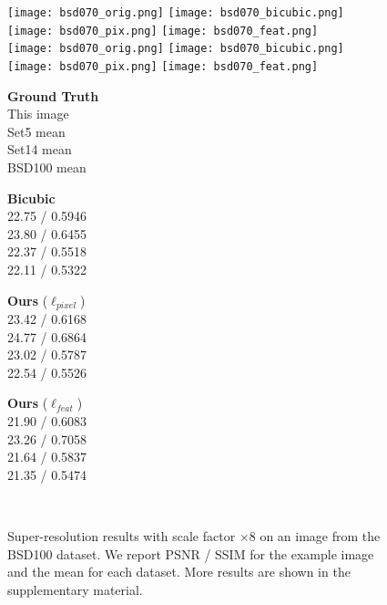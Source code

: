 \documentclass[runningheads]{llncs}
\begin{document}
\begin{figure}[t]
   \centering
\texttt{[image: bsd070\_orig.png]}
  \texttt{[image: bsd070\_bicubic.png]}
  \texttt{[image: bsd070\_pix.png]}
  \texttt{[image: bsd070\_feat.png]} \\
  \texttt{[image: bsd070\_orig.png]}
  \texttt{[image: bsd070\_bicubic.png]}
  \texttt{[image: bsd070\_pix.png]}
  \texttt{[image: bsd070\_feat.png]} \\
  \vspace{1mm}
  \begin{minipage}{0.22\textwidth}
    \centering \textbf{Ground Truth} \\ This image \\ Set5 mean \\ Set14 mean \\ BSD100 mean
  \end{minipage}
  \begin{minipage}{0.22\textwidth}
    \centering \textbf{Bicubic} \\ 22.75 / 0.5946 \\ 23.80 / 0.6455 \\ 22.37 / 0.5518 \\ 22.11 / 0.5322
  \end{minipage}
  \begin{minipage}{0.22\textwidth}
    \centering \textbf{Ours} ($\ell_{pixel}$) \\ 23.42 / 0.6168 \\ 24.77 / 0.6864 \\ 23.02 / 0.5787
      \\ 22.54 / 0.5526 
  \end{minipage}
  \begin{minipage}{0.22\textwidth}
    \centering \textbf{Ours} ($\ell_{feat}$) \\  21.90 / 0.6083 \\ 23.26 / 0.7058 \\ 21.64 / 0.5837 
      \\ 21.35 / 0.5474
  \end{minipage} \\
\vspace{-2mm}
  \caption{Super-resolution results with scale factor $\times8$ on an image from the
    BSD100 dataset. We report PSNR / SSIM for the example image and the mean
    for each dataset. More results are shown in the supplementary material.
  }
  \vspace{-4mm}
  \label{fig:SR-8x-results}
\end{figure}
\end{document}
